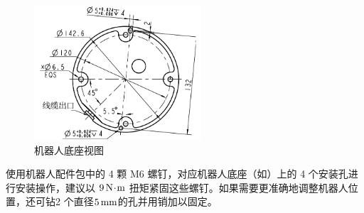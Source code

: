 
\begin{figure}[ht]
    \centering
    \includegraphics[height=5cm]{line_graphs/bottom_surface.pdf}
    \caption{机器人底座视图}
    \label{fig:机器人底座视图}
\end{figure}

使用机器人配件包中的 4 颗 M6 螺钉，对应机器人底座（如）上的 4 个安装孔进行安装操作，建议以 $9\,\mathrm{N\!\cdot\! m}$ 扭矩紧固这些螺钉。如果需要更准确地调整机器人位置，还可钻2 个直径$5 \,\mathrm{mm}$的孔并用销加以固定。


